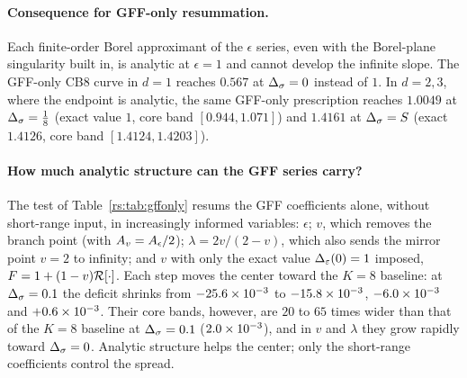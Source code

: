 \paragraph{Consequence for GFF-only resummation.} Each finite-order Borel approximant of the
$\epsilon$ series, even with the Borel-plane singularity built in, is analytic at
$\epsilon=1$ and cannot develop the infinite slope. The GFF-only CB8 curve in $d=1$ reaches $0.567$ at $\Delta_\sigma=0$
instead of $1$. In $d=2,3$, where the endpoint is analytic, the same GFF-only
prescription reaches $1.0049$ at $\Delta_\sigma=\frac18$ (exact value $1$, core band
$[0.944,1.071]$) and $1.4161$ at $\Delta_\sigma=S$ (exact $1.4126$, core band $[1.4124,1.4203]$).

\paragraph{How much analytic structure can the GFF series carry?} The test of
Table~\ref{rs:tab:gffonly} resums the GFF coefficients alone, without short-range input,
in increasingly informed variables: $\epsilon$; $v$, which removes the branch point (with
$A_v=A_\epsilon/2$); $\lambda=2v/(2-v)$, which also sends the mirror point $v=2$ to infinity; and
$v$ with only the exact value $\Delta_\varepsilon(0)=1$ imposed, $F=1+(1-v)\mathcal R[\cdot]$. Each step moves
the center toward the $K=8$ baseline: at $\Delta_\sigma=0.1$ the deficit shrinks from
$-25.6\times10^{-3}$ to $-15.8\times10^{-3}$, $-6.0\times10^{-3}$ and $+0.6\times10^{-3}$. Their core
bands, however, are $20$ to $65$ times wider than that of the $K=8$ baseline at $\Delta_\sigma=0.1$
($2.0\times10^{-3}$), and in $v$ and $\lambda$ they grow rapidly toward $\Delta_\sigma=0$. Analytic
structure helps the center; only the short-range coefficients control the spread.

